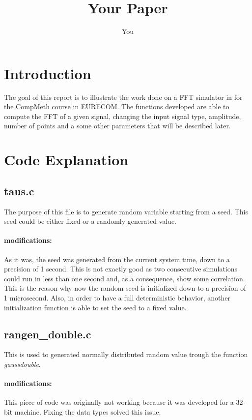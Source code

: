 \documentclass[a4paper]{article}
\title{Your Paper}
\author{You}
\begin{document}
\maketitle

\section{Introduction}

The goal of this report is to illustrate the work done on a FFT simulator in for the CompMeth course in EURECOM.
The functions developed are able to compute the FFT of a given signal, changing the input signal type, amplitude, number of points and a some other parameters that will be described later.

\section{Code Explanation}
\subsection{taus.c}
The purpose of this file is to generate random variable starting from a seed. This seed could be either fixed or a randomly generated value.
\paragraph{modifications:}
As it was, the seed was generated from the current system time, down to a precision of 1 second. This is not exactly good as two consecutive simulations could run in less than one second and, as a consequence, show some correlation. This is the reason why now the random seed is initialized down to a precision of 1 microsecond.
Also, in order to have a full deterministic behavior, another initialization function is able to set the seed to a fixed value.

\subsection{rangen\_double.c}
This is used to generated normally distributed random value trough the function \textit{gaussdouble}.
\paragraph{modifications:}
This piece of code was originally not working because it was developed for a 32-bit machine. Fixing the data types solved this issue.
\end{document}
